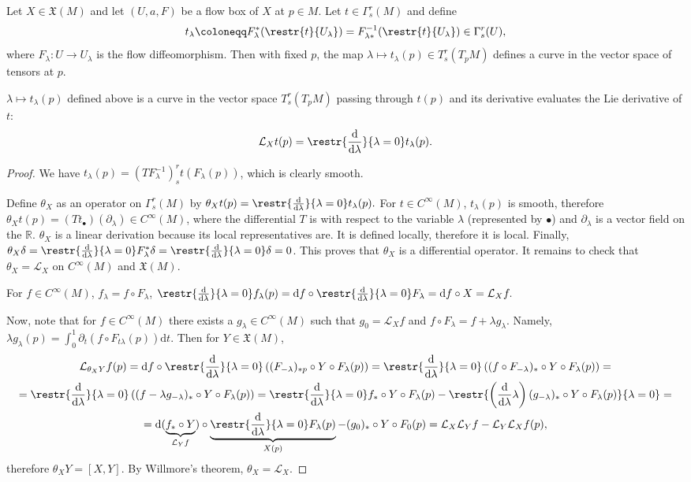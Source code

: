 \documentclass[english,letterpaper]{article}%
\numberwithin{equation}{section}
\numberwithin{figure}{section}
\numberwithin{table}{section}
\theoremstyle{definition}
\theoremstyle{definition}
\theoremstyle{definition}
\theoremstyle{plain}
\theoremstyle{plain}
\theoremstyle{plain}
\theoremstyle{plain}
\theoremstyle{remark}
\theoremstyle{remark}
\newcommand{\dd}{{\mathrm{d}}}
\newcommand{\Lie}{\mathcal{L}}
\newcommand{\fX}{\mathfrak{X}}
\begin{document}
Let $X\in \fX(M)$ and let $(U,a,F)$ be a flow box of $X$ at $p\in M$. Let $t\in\Gamma^r_s(M)$ and define
\[t_\lambda\coloneqq F_{\lambda}^\ast (\restr{t}{U_\lambda})=F_{\lambda\ast}^{-1} (\restr{t}{U_\lambda})\in\Gamma^r_s(U),\]
where $F_\lambda :U\to U_\lambda$ is the flow diffeomorphism. Then with fixed $p$, the map $\lambda\mapsto t_\lambda (p) \in T^r_s (T_p M)$ defines a curve in the vector space of tensors at $p$.
\begin{thm}
    $\lambda\mapsto t_\lambda (p)$ defined above is a curve in the vector space $T^r_s (T_p M)$ passing through $t(p)$ and its derivative evaluates the Lie derivative of $t$:
    \[\Lie_X t(p)=\restr{\frac{\dd}{\dd \lambda}}{\lambda=0}t_\lambda(p).\]
\end{thm}
\begin{proof}
    We have $t_\lambda(p)=(TF_\lambda^{-1})^r_s t(F_\lambda(p))$, which is clearly smooth.

    Define $\theta_X$ as an operator on $\Gamma^r_s(M)$ by $\theta_X t(p)=\restr{\frac{\dd}{\dd \lambda}}{\lambda=0} t_\lambda(p).$
    For $t\in C^\infty(M)$, $t_\lambda(p)$ is smooth, therefore $\theta_X t(p)=(Tt_\bullet)(\partial_\lambda)\in C^\infty(M)$, where the differential $T$ is with respect to the variable $\lambda$ (represented by $\bullet$) and  $\partial_\lambda$ is a vector field on the $\mathbb{R}$. $\theta_X$ is a linear derivation because its local representatives are. It is defined locally, therefore it is local. Finally, $\theta_X\delta=\restr{\frac{\dd}{\dd \lambda}}{\lambda=0} F^\ast_\lambda \delta=\restr{\frac{\dd}{\dd \lambda}}{\lambda=0}\delta=0$. This proves that $\theta_X$ is a differential operator. It remains to check that $\theta_X=\Lie_X$ on $C^\infty(M)$ and $\fX(M)$.

    For $f\in C^\infty(M)$, $f_\lambda=f\circ F_\lambda$, $\restr{\frac{\dd}{\dd \lambda}}{\lambda=0}f_\lambda(p)=\dd f\circ \restr{\frac{\dd}{\dd \lambda}}{\lambda=0}F_\lambda=\dd f\circ X=\Lie_X f.$

    Now, note that for $f\in C^\infty(M)$ there exists a $g_\lambda\in C^\infty(M)$ such that $g_0=\Lie_X f$ and $f\circ F_\lambda=f+\lambda g_\lambda$. Namely, $\lambda g_\lambda (p)=\int_0^1 \partial_t(f\circ F_{t\lambda}(p))\dd t$. Then for $Y\in\fX(M)$,
    \begin{multline}
        \Lie_{\theta_X Y}f(p)=\dd f\circ \restr{\frac{\dd}{\dd \lambda}}{\lambda=0} \left((F_{-\lambda})_{\ast p}\circ Y\circ F_\lambda(p)\right)=\restr{\frac{\dd}{\dd \lambda}}{\lambda=0}\left((f\circ F_{-\lambda})_\ast\circ Y\circ F_\lambda(p)\right)=\\
        =\restr{\frac{\dd}{\dd \lambda}}{\lambda=0} \left((f-\lambda g_{-\lambda})_\ast\circ Y\circ F_\lambda(p)\right)=\restr{\frac{\dd}{\dd \lambda}}{\lambda=0} f_\ast\circ Y\circ F_\lambda (p)-\restr{\left(\frac{\dd}{\dd \lambda}\lambda\right)(g_{-\lambda})_\ast\circ Y\circ F_\lambda(p)}{\lambda=0}=\\=\dd(\underbrace{f_\ast\circ Y}_{\Lie_Yf})\circ \underbrace{\restr{\frac{\dd}{\dd \lambda}}{\lambda=0} F_\lambda(p)}_{X(p)}-(g_0)_\ast \circ Y\circ F_0(p)=\Lie_X\Lie_Y f-\Lie_Y\Lie_X f(p),
    \end{multline}
    therefore $\theta_X Y=[X,Y]$. By Willmore's theorem, $\theta_X=\Lie_X$.
\end{proof}
\end{document}
